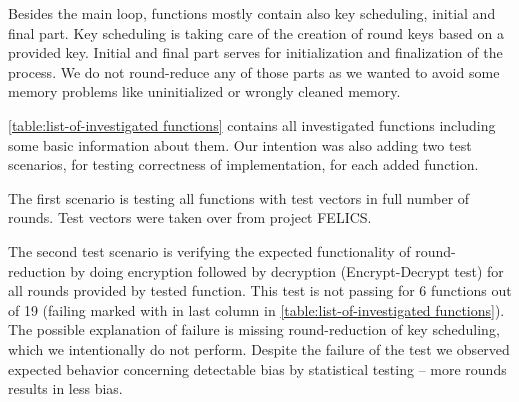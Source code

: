 \documentclass[
    digital,    %
    oneside,    %
    color,
    11pt,
    nocover,
    notable,
    nolof,
    nolot,
    final
]{fithesis3}
\renewcommand\_{\textunderscore\allowbreak}
\newcommand{\xmark}{\ding{55}}%
\begin{document}
Besides the main loop, functions mostly contain also key scheduling, initial and final part. Key scheduling is taking care of the creation of round keys based on a provided key. Initial and final part serves for initialization and finalization of the process. We do not round-reduce any of those parts as we wanted to avoid some memory problems like uninitialized or wrongly cleaned memory.

\cref{table:list-of-investigated functions} contains all investigated functions including some basic information about them. Our intention was also adding two test scenarios, for testing correctness of implementation, for each added function. 

The first scenario is testing all functions with test vectors in full number of rounds. Test vectors were taken over from project FELICS. 

The second test scenario is verifying the expected functionality of round-reduction by doing encryption followed by decryption (Encrypt-Decrypt test) for all rounds provided by tested function. This test is not passing for 6 functions out of 19 (failing marked with \textit{\xmark} in last column in \cref{table:list-of-investigated functions}). The possible explanation of failure is missing round-reduction of key scheduling, which we intentionally do not perform. Despite the failure of the test we observed expected behavior concerning detectable bias by statistical testing -- more rounds results in less bias.
\end{document}
